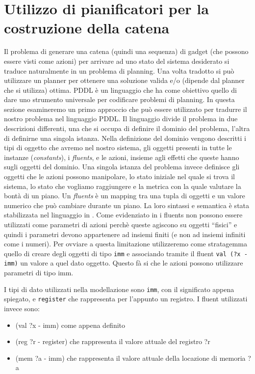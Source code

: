 \section{Utilizzo di pianificatori per la costruzione della
  catena}
\label{sec:pddl}

Il problema di generare una catena (quindi una sequenza) di gadget
(che possono essere visti come azioni) per arrivare ad uno stato del
sistema desiderato si traduce naturalmente in un problema di
planning. Una volta tradotto si può utilizzare un planner per ottenere
una soluzione valida e/o (dipende dal planner che si utilizza)
ottima. PDDL è un linguaggio che ha come obiettivo quello di dare uno
strumento universale per codificare problemi di planning.  In questa
sezione esamineremo un primo approccio che può essere utilizzato per
tradurre il nostro problema nel linguaggio PDDL. Il linguaggio divide
il problema in due descrizioni differenti, una che si occupa di
definire il dominio del problema, l'altra di definirne una singola
istanza. Nella definizione del dominio vengono descritti i tipi di
oggetto che avremo nel nostro sistema, gli oggetti presenti in tutte
le instanze (\emph{constants}), i \emph{fluents}, e le azioni, insieme
agli effetti che queste hanno sugli oggetti del dominio. Una singola
istanza del problema invece definisce gli oggetti che le azioni
possono manipolare, lo stato iniziale nel quale si trova il sistema,
lo stato che vogliamo raggiungere e la metrica con la quale valutare
la bontà di un piano. Un \emph{fluents} è un mapping tra una tupla di
oggetti e un valore numerico che può cambiare durante un piano. La
loro sintassi e semantica è stata stabilizzata nel linguaggio in
\cite{fox-03}. Come evidenziato in \cite{fox-03} i fluents non possono
essere utilizzati come parametri di azioni perchè queste agiscono su
oggetti ``fisici'' e quindi i parametri devono appartenere ad insiemi
finiti (e non ad insiemi infiniti come i numeri). Per ovviare a questa
limitazione utilizzeremo come stratagemma quello di creare degli
oggetti di tipo \lstinline{imm} e associando tramite il fluent
\lstinline{val (?x - imm)} un valore a quel dato oggetto. Questo fà si
che le azioni possono utilizzare parametri di tipo imm.  

I tipi di dato utilizzati nella modellazione sono \lstinline{imm}, con
il significato appena spiegato, e \lstinline{register} che rappresenta
per l'appunto un registro. I fluent utilizzati invece sono:

\begin{itemize}
\item (val ?x - imm) come appena definito
\item (reg ?r - register) che rappresenta il valore attuale del
  registro ?r
\item (mem ?a - imm) che rappresenta il valore attuale della locazione
  di memoria ?a
\end{itemize}

